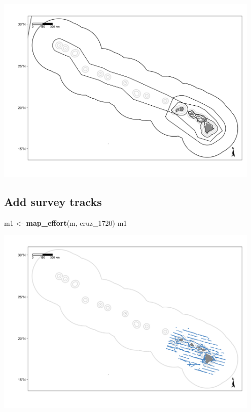 \documentclass[
]{book}
\newenvironment{Shaded}{\begin{snugshade}}{\end{snugshade}}
\newcommand{\FunctionTok}[1]{\textcolor[rgb]{0.13,0.29,0.53}{\textbf{#1}}}
\newcommand{\NormalTok}[1]{#1}
\newcommand{\OtherTok}[1]{\textcolor[rgb]{0.56,0.35,0.01}{#1}}
\begin{document}
\includegraphics[width=0.95\textwidth,height=\textheight]{img/map_cnp_strata.png}

\hypertarget{add-survey-tracks}{%
\subsection*{Add survey tracks}\label{add-survey-tracks}}

\begin{Shaded}
\begin{Highlighting}[]
\NormalTok{m1 }\OtherTok{\textless{}{-}} \FunctionTok{map\_effort}\NormalTok{(m, cruz\_1720)}
\NormalTok{m1}
\end{Highlighting}
\end{Shaded}

\includegraphics[width=0.95\textwidth,height=\textheight]{img/map_tracks.png}
\end{document}

